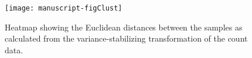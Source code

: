 \documentclass{article}
\begin{document}
\renewcommand*{\refname}{Literature Cited}





\begin{figure}
\centering
\texttt{[image: manuscript-figClust]}
\caption{Heatmap showing the Euclidean distances between the samples
  as calculated from the variance-stabilizing transformation of the
  count data.}
\label{figClust}
\end{figure}
\end{document}
